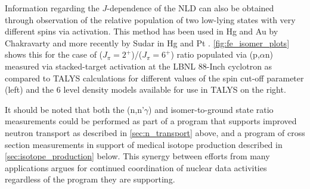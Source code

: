 \documentclass[letterpaper]{ar-1col}
\begin{document}
Information regarding the $J$-dependence of the NLD can also be obtained through observation of the relative population of two low-lying states with very different spins via activation.
 This method has been used in Hg and Au by Chakravarty \cite{PhysRevC.45.1171} and more recently by Sudar in Hg and Pt \cite{PhysRevC.73.034613}.
 \autoref{fig:fe_isomer_plots} shows this for the case of ($J_\pi=2^+$)/($J_\pi=6^+$) ratio populated via (p,$\alpha$n) measured via stacked-target activation at the LBNL 88-Inch cyclotron as compared to TALYS calculations for different values of the spin cut-off parameter (left) and the 6 level density models available for use in TALYS on the right.
 


It should be noted that both the (n,n'$\gamma$) and isomer-to-ground state ratio measurements could be performed as part of a program that supports improved neutron transport as described in \autoref{sec:n_transport} above, and a program of cross section measurements in support of medical isotope production described in \autoref{sec:isotope_production} below.
 This  synergy between efforts from many applications argues for continued coordination of nuclear data activities regardless of the program they are supporting.
 
\end{document}
